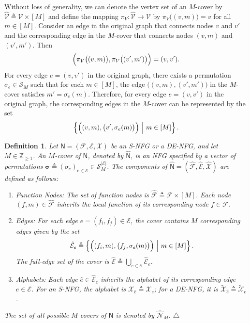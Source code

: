 \documentclass[journal]{IEEEtran}
\newcommand{\add}[1]{{\color{black}#1}}
\newtheorem{definition}[theorem]{Definition}
\newcommand{\manualendsymbol}[1]{%
  \leavevmode\unskip\penalty9999\hbox{}\nobreak\hfill
  \quad\hbox{#1}}
\newcommand{\edefinition}{\manualendsymbol{\ensuremath{\triangle}}}
\newcommand{\vect}[1]{ \bm{#1} }
\newcommand{\set}[1]{\mathcal{#1}}
\newcommand{\graphN}{ \mathsf{N} }
\newcommand{\defeq}{ \triangleq }
\newcommand{\sZpp}{ \mathbb{Z}_{\geq 1} }
\newcommand{\hgraphN}{ \hat{\graphN} }
\newcommand{\setcovN}[1]{ \hat{\set{N}}_{#1} }
\newcommand{\tset}[1]{\tilde{\mathcal{#1}}}
\newcommand{\vsigma}{\vect{\sigma}}
\begin{document}
Without loss of generality, we can denote the vertex set of an $M$-cover by
$\hat{\set{V}} \defeq \set{V} \times [M]$ and define the mapping
$\pi_V: \hat{\set{V}} \to \set{V}$ by $\pi_V\bigl( (v,m) \bigr) = v$ for all
$m \in [M]$. Consider an edge in the original graph that connects nodes $v$ and $v'$ and the corresponding edge in the $M$-cover that connects nodes $(v,m)$ and $(v',m')$. \add{Then}
\begin{align*}
  \Bigl( \pi_V \bigl( (v,m) \bigr), \pi_V \bigl( (v',m') \bigr) \Bigr) = (v,v').
\end{align*}
For every edge $e =(v,v')$ in the original graph, there exists a permutation $\sigma_e \in \set{S}_{M}$ such that for each $ m \in [M] $,
the edge $ \bigl( (v,m), (v',m') \bigr) $ in the $M$-cover satisfies $ m' = \sigma_{e}(m) $. Therefore,
for every edge $e =(v,v')$ in the original graph, the corresponding edges in the $M$-cover
can be represented by the set
\begin{align*}
  \left\{
  \Bigl( (v,m),\bigl(v',\sigma_{e}(m)\bigr) \Bigr)
  \ \middle| \
  m \in [M]
  \right\}.
\end{align*}

\begin{definition}
  \label{sec:GraCov:def:1}
  Let $\graphN = (\set{F}, \set{E}, \set{X})$ be an S-NFG or a DE-NFG, and let $M \in \sZpp$. An $M$-cover of $\graphN$, denoted by $\hgraphN$, is an NFG specified by a vector of permutations $\vsigma \defeq (\sigma_e)_{e \in \set{E}} \in \set{S}_M^{|\set{E}|}$. The components of $\hgraphN = (\hat{\set{F}}, \hat{\set{E}}, \hat{\set{X}})$ are defined as follows:
  \begin{enumerate}
    \item Function Nodes: The set of function nodes is $\hat{\set{F}} \defeq \set{F} \times [M]$. Each node $(f,m) \in \hat{\set{F}}$ inherits the local function of its corresponding node $f \in \set{F}$.
    \item Edges: For each edge $e = (f_i, f_j) \in \set{E}$, the cover contains $M$ corresponding edges given by the set
          \begin{align*}
            \hat{\set{E}}_e \defeq \left\{ \Bigl( (f_i, m), \bigl(f_j, \sigma_e(m) \bigr) \Bigr)
            \ \middle| \ m \in [M] \right\}.
          \end{align*}
          The full-edge set of the cover is $\hat{\set{E}} \defeq \bigcup_{e \in \set{E}} \hat{\set{E}}_e$.
    \item Alphabets: Each edge $\hat{e} \in \hat{\set{E}}_e$ inherits the alphabet of its corresponding edge $e \in \set{E}$. For an S-NFG, the alphabet is $\set{X}_{\hat{e}} \defeq \set{X}_e$; for a DE-NFG, it is $\tset{X}_{\hat{e}} \defeq \tset{X}_e$.
  \end{enumerate}
  The set of all possible $M$-covers of $\graphN$ is denoted by $\setcovN{M}$.
  \edefinition
\end{definition}
\end{document}

